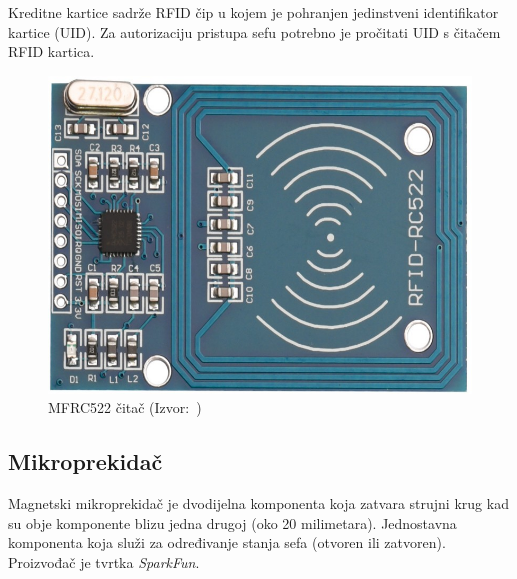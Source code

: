 Kreditne kartice sadrže RFID čip u kojem je pohranjen jedinstveni identifikator kartice (UID).
Za autorizaciju pristupa sefu potrebno je pročitati UID s čitačem RFID kartica.

\begin{figure}[h!]
    \centering
    \includegraphics[scale=0.25]{images/mfrc522}
    \caption{MFRC522 čitač (Izvor:~\cite{mfrc522-eradionica})}
\end{figure}

\subsection{Mikroprekidač}

Magnetski mikroprekidač je dvodijelna komponenta koja zatvara strujni krug kad su obje komponente blizu jedna drugoj
(oko 20 milimetara).
Jednostavna komponenta koja služi za određivanje stanja sefa (otvoren ili zatvoren).
Proizvođač je tvrtka \textit{SparkFun}.

